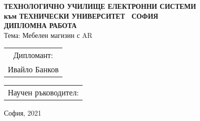 \begin{center}
    \textbf{\Large ТЕХНОЛОГИЧНО УЧИЛИЩЕ ЕЛЕКТРОННИ СИСТЕМИ\\[0.2cm]}
    \textbf{към ТЕХНИЧЕСКИ УНИВЕРСИТЕТ \textendash\ СОФИЯ\\[6cm]}
    \textbf{\LARGE ДИПЛОМНА РАБОТА\\[4cm]}
    Тема: Мебелен магизин с AR\\[4cm]

    \begin{minipage}[t]{0.4\textwidth}
    \begin{flushleft}
        \begin{tabular}{@{}c@{}}
            \large {Дипломант:}\\
            Ивайло Банков
        \end{tabular}
    \end{flushleft}
    \end{minipage}
    \begin{minipage}[t]{0.4\textwidth}
    \begin{flushright}
        \begin{tabular}{@{}c@{}}
            \large {Научен ръководител:}\\
            
        \end{tabular}
    \end{flushright}
    \end{minipage}

    \vfill

    {\large София, 2021}
\end{center}